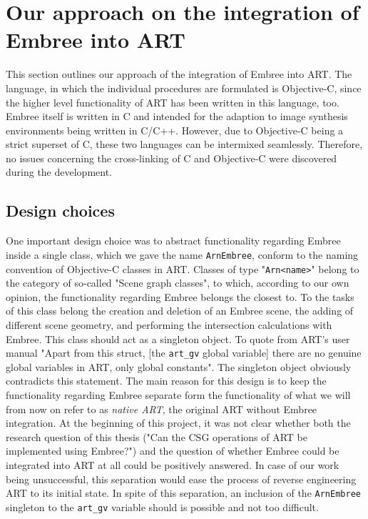 \chapter{Our approach on the integration of Embree into ART}
\label{chap:math}

This section outlines our approach of the integration of Embree into ART. The language, in which the individual procedures  are formulated is Objective-C, since the higher level functionality of ART has been written in this language, too. Embree itself is written in C and intended for the adaption to image synthesis environments being written in C/C++. However, due to Objective-C being a strict superset of C, these two languages can be intermixed seamlessly. Therefore, no issues concerning the cross-linking of C and Objective-C were discovered during the development.

\section{Design choices}

One important design choice was to abstract functionality regarding Embree inside a single class, which we gave the name \texttt{ArnEmbree}, conform to the naming convention of Objective-C classes in ART. Classes of type "\texttt{Arn<name>}" belong to the category of so-called "Scene graph classes", to which, according to our own opinion, the functionality regarding Embree belongs the closest to. To the tasks of this class belong the creation and deletion of an Embree scene, the adding of different scene geometry, and performing the intersection calculations with Embree. This class should act as a singleton object. To quote from ART's user manual \cite[Chapter 4.1.2]{arthandbook} "Apart from this struct, [the \texttt{art\_gv} global variable] there are no genuine global variables in ART, only global constants". The singleton object obviously contradicts this statement. The main reason for this design is to keep the functionality regarding Embree separate form the functionality of what we will from now on refer to as \emph{native ART}, the original ART without Embree integration. At the beginning of this project, it was not clear whether both the research question of this thesis ("Can the CSG operations of ART be implemented using Embree?") and the question of whether Embree could be integrated into ART at all could be positively answered. In case of our work being unsuccessful, this separation would ease the process of reverse engineering ART to its initial state.
In spite of this separation, an inclusion of the \texttt{ArnEmbree} singleton to the \texttt{art\_gv} variable should is possible and not too difficult.

